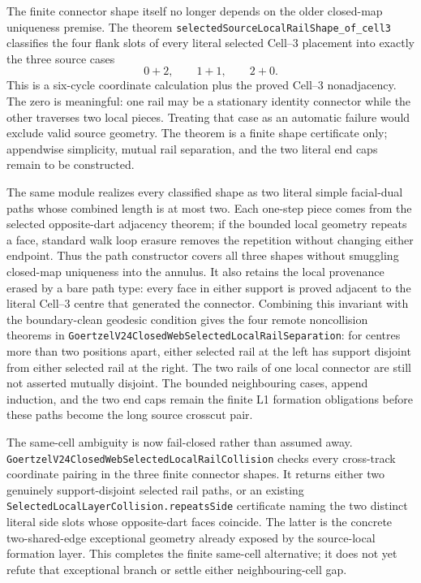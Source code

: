 \documentclass[11pt]{article}
\theoremstyle{definition}
\begin{document}
The finite connector shape itself no longer depends on the older closed-map
uniqueness premise.  The theorem
\texttt{selectedSourceLocalRailShape\_of\_cell3} classifies the four flank
slots of every literal selected Cell--3 placement into exactly the three
source cases
\[
                 0+2,\qquad 1+1,\qquad 2+0.
\]
This is a six-cycle coordinate calculation plus the proved Cell--3
nonadjacency.  The zero is meaningful: one rail may be a stationary identity
connector while the other traverses two local pieces.  Treating that case as
an automatic failure would exclude valid source geometry.  The theorem is a
finite shape certificate only; appendwise simplicity, mutual rail separation,
and the two literal end caps remain to be constructed.

The same module realizes every classified shape as two literal simple
facial-dual paths whose combined length is at most two.  Each one-step piece
comes from the selected opposite-dart adjacency theorem; if the bounded local
geometry repeats a face, standard walk loop erasure removes the repetition
without changing either endpoint.  Thus the path constructor covers all
three shapes without smuggling closed-map uniqueness into the annulus.  It
also retains the local provenance erased by a bare path type: every face in
either support is proved adjacent to the literal Cell--3 centre that generated
the connector.  Combining this invariant with the boundary-clean geodesic
condition gives the four remote noncollision theorems in
\texttt{GoertzelV24ClosedWebSelectedLocalRailSeparation}: for centres more
than two positions apart, either selected rail at the left has support
disjoint from either selected rail at the right.  The two rails of one local
connector are still not asserted mutually disjoint.  The bounded neighbouring
cases, append induction, and the two end caps remain the finite L1 formation
obligations before these paths become the long source crosscut pair.

The same-cell ambiguity is now fail-closed rather than assumed away.
\texttt{GoertzelV24ClosedWebSelectedLocalRailCollision} checks every
cross-track coordinate pairing in the three finite connector shapes.  It
returns either two genuinely support-disjoint selected rail paths, or an
existing \texttt{SelectedLocalLayerCollision.repeatsSide} certificate naming
the two distinct literal side slots whose opposite-dart faces coincide.  The
latter is the concrete two-shared-edge exceptional geometry already exposed
by the source-local formation layer.  This completes the finite same-cell
alternative; it does not yet refute that exceptional branch or settle either
neighbouring-cell gap.
\end{document}
